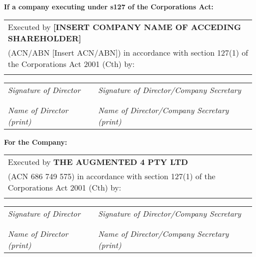 \vspace{3em}

\textbf{If a company executing under s127 of the Corporations Act:}

\begin{tabular}{p{16cm}}
Executed by \textbf{[INSERT COMPANY NAME OF ACCEDING SHAREHOLDER]} \\
(ACN/ABN [Insert ACN/ABN]) in accordance with section 127(1) of the Corporations Act 2001 (Cth) by: \\
\\
\end{tabular}

\begin{tabular}{p{8cm}p{8cm}}
\cline{1-1}\cline{2-2} \\
\textit{Signature of Director} & \textit{Signature of Director/Company Secretary} \\
& \\
\cline{1-1}\cline{2-2} \\
\textit{Name of Director (print)} & \textit{Name of Director/Company Secretary (print)} \\
\end{tabular}

\vspace{3em}

\textbf{For the Company:}

\begin{tabular}{p{16cm}}
Executed by \textbf{THE AUGMENTED 4 PTY LTD} \\
(ACN 686 749 575) in accordance with section 127(1) of the Corporations Act 2001 (Cth) by: \\
\\
\end{tabular}

\begin{tabular}{p{8cm}p{8cm}}
\cline{1-1}\cline{2-2} \\
\textit{Signature of Director} & \textit{Signature of Director/Company Secretary} \\
& \\
\cline{1-1}\cline{2-2} \\
\textit{Name of Director (print)} & \textit{Name of Director/Company Secretary (print)} \\
\end{tabular} 